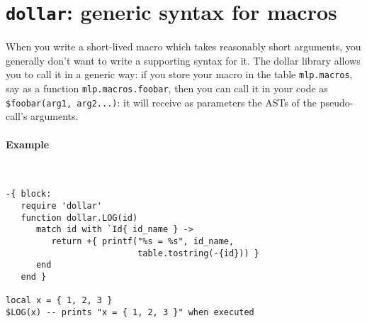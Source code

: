 \section[Dollar extension]{{\tt dollar}: generic syntax for macros}
When you write a short-lived macro which takes reasonably short arguments, you
generally don't want to write a supporting syntax for it. The dollar library
allows you to call it in a generic way: if you store your macro in the table
{\tt mlp.macros}, say as a function {\tt mlp.macros.foobar}, then you can call it
in your code as {\tt\$foobar(arg1, arg2...)}: it will receive as parameters the
ASTs of the pseudo-call's arguments.

\paragraph{Example}~
\begin{verbatim}
-{ block:
   require 'dollar'
   function dollar.LOG(id)
      match id with `Id{ id_name } -> 
         return +{ printf("%s = %s", id_name, 
                          table.tostring(-{id})) }
      end
   end }

local x = { 1, 2, 3 }
$LOG(x) -- prints "x = { 1, 2, 3 }" when executed
\end{verbatim}
